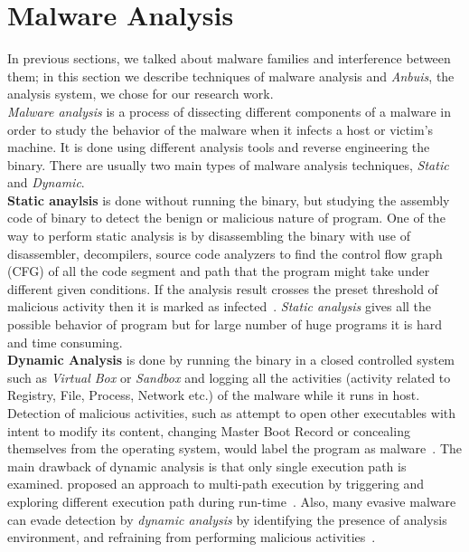 \section{Malware Analysis}
\label{sec:Malware Analysis}
In previous sections, we talked about malware families and interference between them; in this section we describe techniques of malware analysis and \emph{Anbuis}, the analysis system, we chose for our research work.\\
\emph{Malware analysis} is a process of dissecting different components of a malware in order to study the behavior of the malware when it infects a host or victim's machine.
It is done using different analysis tools and reverse engineering the binary.
There are usually two main types of malware analysis techniques, \emph{Static} and \emph{Dynamic}.\\
\textbf{Static anaylsis} is done without running the binary, but studying the assembly code of binary to detect the benign or malicious nature of program.
One of the way to perform static analysis is by disassembling the binary with use of disassembler, decompilers, source code analyzers to find the control flow graph (CFG) of all the code segment and path that the program might take under different given conditions.
If the analysis result crosses the preset threshold of malicious activity then it is marked as infected~\cite[]{sharma2014}.
\emph{Static analysis} gives all the possible behavior of program but for large number of huge programs it is hard and time consuming.\\
\textbf{Dynamic Analysis} is done by running the binary in a closed controlled system such as \emph{Virtual Box} or \emph{Sandbox} and logging all the activities (activity related to Registry, File, Process, Network etc.) of the malware while it runs in host.
Detection of malicious activities, such as attempt to open other executables with intent to modify its content, changing Master Boot Record or concealing themselves from the operating system, would label the program as malware~\cite[]{sharma2014}.
The main drawback of dynamic analysis is that only single execution path is examined.
\citeauthor{chipounov2012s2e} proposed an approach to multi-path execution by triggering and exploring different execution path during run-time~\cite[]{chipounov2012s2e}.
Also, many evasive malware can evade detection by \emph{dynamic analysis} by identifying the presence of analysis environment, and refraining from performing malicious activities~\cite[]{barecloud}.
\\
